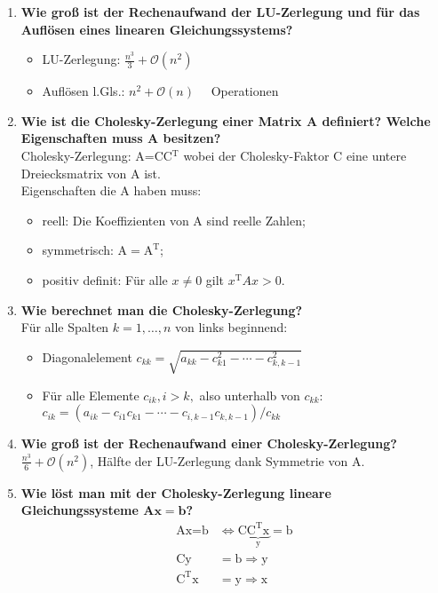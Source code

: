 \begin{enumerate}
		\item \textbf{Wie groß ist der Rechenaufwand der LU-Zerlegung und für das Auflösen eines linearen Gleichungssystems?}
		\begin{itemize}
			\item LU-Zerlegung: \(\frac{n^3}{3}+\mathcal{O}(n^2) \quad\) 
			\item Auflösen l.Gls.: \(n^2+\mathcal{O}(n) \quad\) Operationen
		\end{itemize}
		
		\pagebreak
		\item \textbf{Wie ist die Cholesky-Zerlegung einer Matrix A definiert? Welche Eigenschaften muss A besitzen?} \\
			Cholesky-Zerlegung: A=CC\(^\text{T}\) wobei der Cholesky-Faktor C eine untere Dreiecksmatrix von A ist. \\
			Eigenschaften die A haben muss:
			\begin{itemize}
				\item reell: Die Koeffizienten von A sind reelle Zahlen;
				\item symmetrisch: \(\text{A}=\text{A}^\text{T}\);
				\item positiv definit: Für alle \(x\neq0\) gilt \(x^\text{T}Ax>0\).
			\end{itemize}
		
		\item \textbf{Wie berechnet man die Cholesky-Zerlegung?} \\
			Für alle Spalten \(k=1,\dots,n\) von links beginnend:
			\begin{itemize}
				\item[] Diagonalelement \(c_{kk}=\sqrt{a_{kk}-c_{k1}^2-\cdots-c_{k,k-1}^2}\)
				\item[] Für alle Elemente \(c_{ik},i>k,\) also unterhalb von \(c_{kk}\):\\
				\mbox{}\hspace{0.5cm}\(c_{ik}=(a_{ik}-c_{i1}c_{k1}-\cdots-c_{i,k-1}c_{k,k-1})/c_{kk}\)
			\end{itemize}
		
		\item \textbf{Wie groß ist der Rechenaufwand einer Cholesky-Zerlegung?} \\
			\(\frac{n^3}{6}+\mathcal{O}(n^2)\), Hälfte der LU-Zerlegung dank Symmetrie von A.
		
		\item \textbf{Wie löst man mit der Cholesky-Zerlegung lineare Gleichungssysteme \(\mathbf{Ax=b}\)?}
			\begin{align*}
				\text{Ax}=\text{b}&\Longleftrightarrow \text{C}\underbrace{\text{C}^\text{T}\text{x}}_\text{y}=\text{b} \\
				\text{Cy}&=\text{b} \Rightarrow \text{y} \\
				\text{C}^\text{T}\text{x}&=\text{y} \Rightarrow \text{x}
			\end{align*}
		

\end{enumerate}
